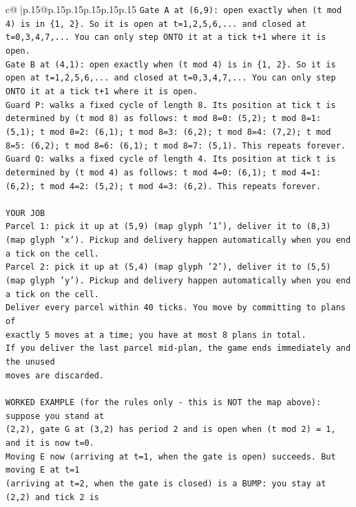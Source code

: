 \documentclass{article}
\begin{document}
{\begin{supertabular}{c@{$\;$}|p{.15\linewidth}@{}p{.15\linewidth}p{.15\linewidth}p{.15\linewidth}p{.15\linewidth}p{.15\linewidth}}
{{{\texttt{Gate A at (6,9): open exactly when (t mod 4) is in \{1, 2\}. So it is open at t=1,2,5,6,... and closed at t=0,3,4,7,... You can only step ONTO it at a tick t+1 where it is open.} \\
\texttt{Gate B at (4,1): open exactly when (t mod 4) is in \{1, 2\}. So it is open at t=1,2,5,6,... and closed at t=0,3,4,7,... You can only step ONTO it at a tick t+1 where it is open.} \\
\texttt{Guard P: walks a fixed cycle of length 8. Its position at tick t is determined by (t mod 8) as follows: t mod 8=0: (5,2); t mod 8=1: (5,1); t mod 8=2: (6,1); t mod 8=3: (6,2); t mod 8=4: (7,2); t mod 8=5: (6,2); t mod 8=6: (6,1); t mod 8=7: (5,1). This repeats forever.} \\
\texttt{Guard Q: walks a fixed cycle of length 4. Its position at tick t is determined by (t mod 4) as follows: t mod 4=0: (6,1); t mod 4=1: (6,2); t mod 4=2: (5,2); t mod 4=3: (6,2). This repeats forever.} \\
\\ 
\texttt{YOUR JOB} \\
\texttt{Parcel 1: pick it up at (5,9) (map glyph '1'), deliver it to (8,3) (map glyph 'x'). Pickup and delivery happen automatically when you end a tick on the cell.} \\
\texttt{Parcel 2: pick it up at (5,4) (map glyph '2'), deliver it to (5,5) (map glyph 'y'). Pickup and delivery happen automatically when you end a tick on the cell.} \\
\texttt{Deliver every parcel within 40 ticks. You move by committing to plans of} \\
\texttt{exactly 5 moves at a time; you have at most 8 plans in total.} \\
\texttt{If you deliver the last parcel mid{-}plan, the game ends immediately and the unused} \\
\texttt{moves are discarded.} \\
\\ 
\texttt{WORKED EXAMPLE (for the rules only {-} this is NOT the map above): suppose you stand at} \\
\texttt{(2,2), gate G at (3,2) has period 2 and is open when (t mod 2) = 1, and it is now t=0.} \\
\texttt{Moving E now (arriving at t=1, when the gate is open) succeeds. But moving E at t=1} \\
\texttt{(arriving at t=2, when the gate is closed) is a BUMP: you stay at (2,2) and tick 2 is} \\
}}}
\end{supertabular}}
\end{document}
